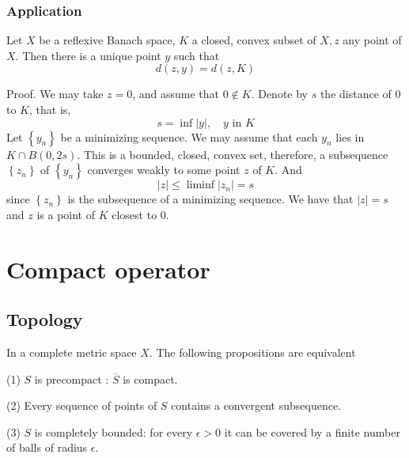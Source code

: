 \documentclass[12pt, oneside]{book}
\begin{document}
\subsection{Application}
\begin{theorem}
    Let $X$ be a reflexive Banach space, $K$ a closed, convex subset of $X, z$ any point of $X$. Then there is a unique point $y$ such that
    \begin{equation*}
        d(z,y)
        =
        d(z,K)
    \end{equation*}


    Proof. We may take $z=0$, and assume that $0 \notin K$. Denote by $s$ the distance of 0 to $K$, that is,
    \begin{equation*}
        s=\inf |y|, \quad y \text { in } K
    \end{equation*}
    Let $\left\{y_n\right\}$ be a minimizing sequence.
    We may assume that each $y_n$ lies in $K\cap B(0,2s)$. This is a bounded, closed, convex set, therefore, a subsequence $\left\{z_n\right\}$ of $\left\{y_n\right\}$ converges weakly to some point $z$ of $K$. And
    \begin{equation*}
        |z|
        \leq
        \liminf \left|z_n\right|
        =
        s
    \end{equation*}
    since $\left\{z_n\right\}$ is the subsequence of a minimizing sequence. We have that $\left|z\right|=s$ and $z$ is a point of $K$ closest to $0$.
\end{theorem}


































\chapter{Compact operator}

\section{Topology}
\begin{proposition}
    In a complete metric space $X$. The following propositions are equivalent

    (1) $S$ is precompact : $\overline{S}$ is compact.

    (2) Every sequence of points of $S$ contains a convergent subsequence.

    (3) $S$ is completely bounded: for every $\epsilon>0$ it can be covered by a finite number of balls of radius $\epsilon$.
\end{proposition}
\end{document}
